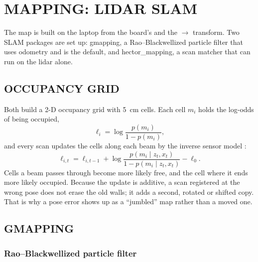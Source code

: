 \chapter{MAPPING: LIDAR SLAM}
\label{ch:slam}

The map is built on the laptop from the board's  and the
$\to$ transform. Two SLAM packages are set up:
gmapping, a Rao--Blackwellized particle filter that uses odometry and is the
default, and hector\_mapping, a scan matcher that can run on the lidar alone.

\section{OCCUPANCY GRID}

Both build a 2-D occupancy grid with \SI{5}{cm} cells. Each cell $m_i$ holds
the log-odds of being occupied,
\begin{equation}
\ell_i = \log\frac{p(m_i)}{1-p(m_i)},
\end{equation}
and every scan updates the cells along each beam by the inverse sensor model
\cite{thrun2005probabilistic}:
\begin{equation}\label{eq:logodds}
\ell_{i,t} = \ell_{i,t-1} + \log\frac{p(m_i\mid z_t,x_t)}{1-p(m_i\mid z_t,x_t)} - \ell_0 .
\end{equation}
Cells a beam passes through become more likely free, and the cell where it
ends more likely occupied. Because the update is additive, a scan registered
at the wrong pose does not erase the old walls; it adds a second, rotated or
shifted copy. That is why a pose error shows up as a ``jumbled'' map rather
than a moved one.

\section{GMAPPING}
\label{sec:gmapping}

\subsection{Rao--Blackwellized particle filter}


